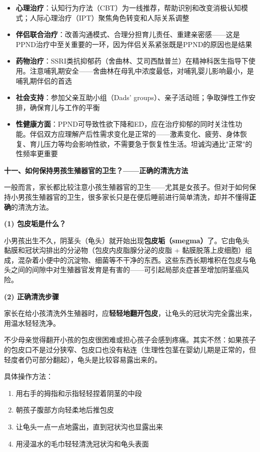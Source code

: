 \begin{enumerate}
\begin{itemize}[leftmargin=2cm]
	\item \textbf{心理治疗}：认知行为疗法（CBT）为一线推荐，帮助识别和改变消极认知模式；人际心理治疗（IPT）聚焦角色转变和人际关系调整
	\item \textbf{伴侣联合治疗}：改善沟通模式、合理分担育儿责任、重建亲密感——这是PPND治疗中至关重要的一环，因为伴侣关系紧张既是PPND的原因也是结果
	\item \textbf{药物治疗}：SSRI类抗抑郁药（舍曲林、艾司西酞普兰）在精神科医生指导下使用。注意哺乳期安全——舍曲林在母乳中浓度最低，对哺乳婴儿影响最小，是哺乳期伴侣的首选
	\item \textbf{社会支持}：参加父亲互助小组（Dads' groups）、亲子活动班；争取弹性工作安排，确保育儿与工作的平衡
	\item \textbf{性健康方面}：PPND可导致性欲下降和ED，应在治疗抑郁的同时关注性功能。伴侣双方应理解产后性需求变化是正常的——激素变化、疲劳、身体恢复、育儿压力等均会影响性欲，不需要急于恢复性生活。坦诚沟通比"正常"的性频率更重要
\end{itemize}

\vspace{0.8em}
\noindent\textbf{十一、如何保持男孩生殖器官的卫生？——正确的清洗方法}

一般而言，家长都比较注意小孩生殖器官的卫生——尤其是女孩子。但对于如何保持小男孩生殖器官的卫生，很多家长只是在便后睡前进行简单清洗，却并不懂得\textbf{正确}的清洗方法。

\vspace{0.5em}
\noindent\textbf{(1) 包皮垢是什么？}

小男孩出生不久，阴茎头（龟头）就开始出现\textbf{包皮垢（smegma）}了。它由龟头黏膜和冠状沟排出的分泌物（包皮内皮脂腺分泌的皮脂 + 黏膜脱落上皮细胞）组成，混杂着小便中的沉淀物、细菌等不干净的东西。这些东西长期堆积在包皮与龟头之间的间隙中对生殖器官发育是有害的——可引起局部炎症甚至增加阴茎癌风险。

\vspace{0.3em}
\noindent\textbf{(2) 正确清洗步骤}

家长在给小孩清洗外生殖器时，应\textbf{轻轻地翻开包皮}，让龟头的冠状沟完全露出来，用温水轻轻洗净。

不少母亲觉得翻开小孩的包皮很困难或担心孩子会感到疼痛。其实不然：如果孩子的包皮口不是过分狭窄、包皮口也没有粘连（生理性包茎在婴幼儿期是正常的，但轻度者仍可部分翻起），龟头是比较容易露出来的。

具体操作方法：
\begin{enumerate}
	\item 用右手的拇指和示指轻轻捏着阴茎的中段
	\item 朝孩子腹部方向轻柔地后推包皮
	\item 让龟头一点一点地露出，直到冠状沟也显露出来
	\item 用浸温水的毛巾轻轻清洗冠状沟和龟头表面
\end{enumerate}


\end{enumerate}
